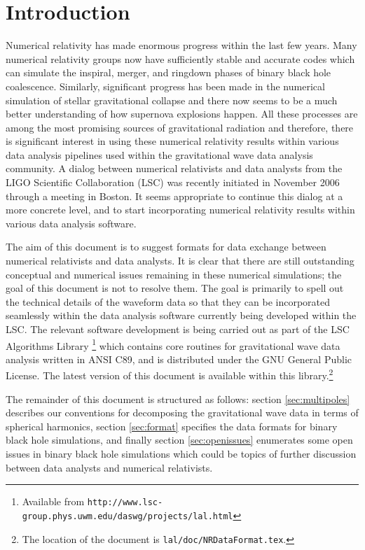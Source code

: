 \documentclass[prd,preprintnumbers,superscriptaddress,eqsecnum]{revtex4}
\numberwithin{equation}{section}
\begin{document}
\section{Introduction}
\label{sec:intro}

Numerical relativity has made enormous progress within the last few
years.  Many numerical relativity groups now have sufficiently stable
and accurate codes which can simulate the inspiral, merger, and
ringdown phases of binary black hole coalescence.  Similarly,
significant progress has been made in the numerical simulation of
stellar gravitational collapse and there now seems to be a much better
understanding of how supernova explosions happen.  All these processes
are among the most promising sources of gravitational radiation and
therefore, there is significant interest in using these numerical
relativity results within various data analysis pipelines used within
the gravitational wave data analysis community.  A dialog between
numerical relativists and data analysts from the LIGO Scientific
Collaboration (LSC) was recently initiated in November 2006 through a
meeting in Boston. It seems appropriate to continue this dialog at a
more concrete level, and to start incorporating numerical relativity
results within various data analysis software.

The aim of this document is to suggest formats for data exchange
between numerical relativists and data analysts.  It is clear that
there are still outstanding conceptual and numerical issues remaining
in these numerical simulations; the goal of this document is not to
resolve them.  The goal is primarily to spell out the technical
details of the waveform data so that they can be incorporated
seamlessly within the data analysis software currently being developed
within the LSC.  The relevant software development is being carried
out as part of the LSC Algorithms Library \footnote{Available from
  \texttt{http://www.lsc-group.phys.uwm.edu/daswg/projects/lal.html}}
which contains core routines for gravitational wave data analysis
written in ANSI C89, and is distributed under the GNU General Public
License.  The latest version of this document is available within this
library.\footnote{The location of the document is
  \texttt{lal/doc/NRDataFormat.tex}.}
  
The remainder of this document is structured as follows: section
\ref{sec:multipoles} describes our conventions for decomposing the
gravitational wave data in terms of spherical harmonics, section
\ref{sec:format} specifies the data formats for binary black hole
simulations, and finally section \ref{sec:openissues} enumerates some
open issues in binary black hole simulations which could be topics of
further discussion between data analysts and numerical relativists.
\end{document}
